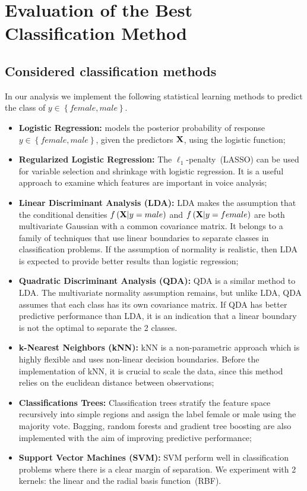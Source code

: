 \chapter{Evaluation of the Best Classification Method}
\label{chapter_classification}
\section{Considered classification methods}
\label{sec_considered_classif}
In our analysis we implement the following statistical learning methods to predict the class of $ y \in \left\lbrace female, male \right\rbrace$.
\begin{itemize}
	\item \textbf{Logistic Regression:} models the posterior probability of response $y\in \left\lbrace female, male \right\rbrace$, given the predictors $\mathbf{X}$, using the logistic function;
	
	\item \textbf{Regularized Logistic Regression:} The $\ell_1$-penalty~(LASSO) can be used for variable selection and shrinkage with logistic regression. It is a useful approach to examine which features are  important in voice analysis;
	
	\item \textbf{Linear Discriminant Analysis (LDA):} LDA makes the assumption that the conditional densities $f \left(\mathbf{X}|y=male \right)$ and $ f \left(\mathbf{X}|y=female \right)$ are both multivariate Gaussian with a common covariance matrix. It belongs to a family of techniques that use linear boundaries to separate classes in classification problems. If the assumption of normality is realistic, then LDA is expected to provide better results than logistic regression;
	
	\item \textbf{Quadratic Discriminant Analysis (QDA):} QDA is a similar method to LDA. The multivariate normality assumption remains, but unlike LDA, QDA assumes that each class has its own covariance matrix. If QDA has better predictive performance than LDA, it is an indication that a linear boundary is not the optimal to separate the 2 classes.
	
	\item \textbf{k-Nearest Neighbors (kNN):} kNN is a non-parametric approach which is highly flexible and uses non-linear decision boundaries. Before the implementation of kNN, it is crucial to scale the data, since this method relies on the euclidean distance between observations;
	
	\item \textbf{Classifications Trees:} Classification trees stratify the feature space recursively into simple regions and assign the label female or male using the majority vote. Bagging, random forests and gradient tree boosting are also implemented with the aim of improving predictive performance;
	
	\item \textbf{Support Vector Machines (SVM):} SVM perform well in classification problems where there is a clear margin of separation. We experiment with 2 kernels: the linear and the radial basis function~(RBF).
\end{itemize}
